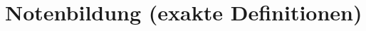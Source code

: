 \vspace*{-0.8cm}
\section{Notenbildung (exakte Definitionen)}



\newcommand{\defformat}[1]{\tikz[baseline=(char.base)]{\node[draw,rectangle,inner sep=2pt] (char) {\textit{#1}};}}

\newcommand{\defka}{\defformat{KA}}
\newcommand{\defgfs}{\defformat{GFS}}
\newcommand{\defkt}{\defformat{KT}}
\newcommand{\defktp}{\defformat{P}}
\newcommand{\defsl}{\defformat{S}}
\newcommand{\defv}{\defformat{V}}
\newcommand{\defm}{\defformat{M}}
\newcommand{\defe}{\defformat{E}}
\newcommand{\defsn}{\defformat{N}}
\newcommand{\defsnp}{\defformat{NP}}

\newcommand{\catka}{\defka~und~\defgfs}
\newcommand{\catkt}{\defkt~und~\defsl~und~\defktp}
\newcommand{\catm}{\defm~und~\defe}

\newcommand{\defgn}{GN}
\newcommand{\defrn}{RN}
\newcommand{\defzn}{ZN}

